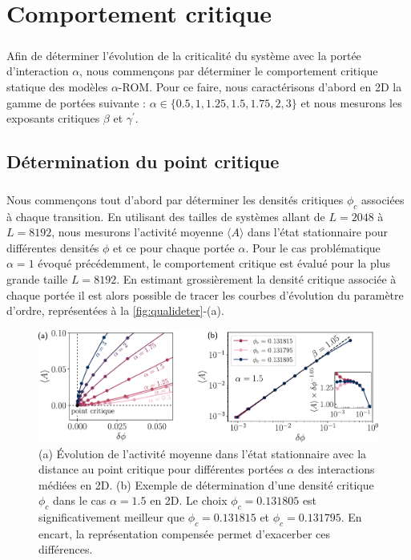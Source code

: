 \section{Comportement critique}

\subparagraph{}Afin de déterminer l'évolution de la criticalité du système avec la portée d'interaction $\alpha$, nous commençons par déterminer le comportement critique statique des modèles $\alpha$-ROM. Pour ce faire, nous caractérisons d'abord en 2D la gamme de portées suivante : $\alpha \in \{ 0.5, 1, 1.25, 1.5, 1.75, 2, 3 \}$ et nous mesurons les exposants critiques $\beta$ et $\gamma^\prime$. 

\subsection{Détermination du point critique}

\subparagraph{}Nous commençons tout d'abord par déterminer les densités critiques $\phi_c$ associées à chaque transition. En utilisant des tailles de systèmes allant de $L=2048$ à $L=8192$, nous mesurons l'activité moyenne $\langle A \rangle$ dans l'état stationnaire pour différentes densités $\phi$ et ce pour chaque portée $\alpha$. Pour le cas problématique $\alpha=1$ évoqué précédemment, le comportement critique est évalué pour la plus grande taille $L=8192$. En estimant grossièrement la densité critique associée à chaque portée il est alors possible de tracer les courbes d'évolution du paramètre d'ordre, représentées à la \autoref{fig:qualideter}-(a).

\begin{figure}[h]
	\centering	\includegraphics[width=\textwidth]{Chapitre3/Figures/BetaGamma/EvolMeanDeter.pdf}
	\caption{(a) Évolution de l'activité moyenne dans l'état stationnaire avec la distance au point critique pour différentes portées $\alpha$ des interactions médiées en 2D. (b) Exemple de détermination d'une densité critique $\phi_c$ dans le cas $\alpha = 1.5$ en 2D. Le choix $\phi_c = 0.131805$ est significativement meilleur que $\phi_c = 0.131815$ et $\phi_c = 0.131795$. En encart, la représentation compensée permet d'exacerber ces différences.}
	\label{fig:qualideter}
\end{figure}

